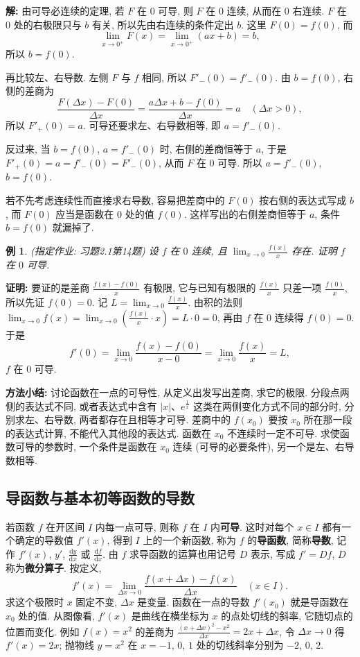 \documentclass[UTF8,openany]{ctexbook}
\theoremstyle{chinesetextbook}
\newtheorem{example}{例}[section]
\newenvironment{cnproof}{\par\indent\textbf{证明:} \ignorespaces}{\par}
\newenvironment{cnsolution}{\par\indent\textbf{解:} \ignorespaces}{\par}
\newcommand{\dd}{\mathrm d}
\begin{document}
\begin{cnsolution}
由可导必连续的定理, 若 $F$ 在 $0$ 可导, 则 $F$ 在 $0$ 连续, 从而在 $0$ 右连续. $F$ 在 $0$ 处的右极限只与 $b$ 有关, 所以先由右连续的条件定出 $b$. 这里 $F(0)=f(0)$, 而
\[
\lim_{x\to0^+}F(x)=\lim_{x\to0^+}(ax+b)=b,
\]
所以 $b=f(0)$.

再比较左、右导数. 左侧 $F$ 与 $f$ 相同, 所以 $F'_-(0)=f'_-(0)$. 由 $b=f(0)$, 右侧的差商为
\[
\frac{F(\Delta x)-F(0)}{\Delta x}=\frac{a\Delta x+b-f(0)}{\Delta x}=a\quad(\Delta x>0),
\]
所以 $F'_+(0)=a$. 可导还要求左、右导数相等, 即 $a=f'_-(0)$.

反过来, 当 $b=f(0)$, $a=f'_-(0)$ 时, 右侧的差商恒等于 $a$, 于是 $F'_+(0)=a=f'_-(0)=F'_-(0)$, 从而 $F$ 在 $0$ 可导. 所以 $a=f'_-(0)$, $b=f(0)$.
\end{cnsolution}
若不先考虑连续性而直接求右导数, 容易把差商中的 $F(0)$ 按右侧的表达式写成 $b$, 而 $F(0)$ 应当是函数在 $0$ 处的值 $f(0)$. 这样写出的右侧差商恒等于 $a$, 条件 $b=f(0)$ 就漏掉了.
\begin{example}\label{ex:c2-h1-14}
\textnormal{(指定作业: 习题2.1第14题)} 设 $f$ 在 $0$ 连续, 且 $\displaystyle\lim_{x\to0}\frac{f(x)}x$ 存在. 证明 $f$ 在 $0$ 可导.
\end{example}
\begin{cnproof}
要证的是差商 $\displaystyle\frac{f(x)-f(0)}x$ 有极限, 它与已知有极限的 $\displaystyle\frac{f(x)}x$ 只差一项 $\displaystyle\frac{f(0)}x$, 所以先证 $f(0)=0$. 记 $\displaystyle L=\lim_{x\to0}\frac{f(x)}x$. 由积的法则 $\displaystyle\lim_{x\to0}f(x)=\lim_{x\to0}\left(\frac{f(x)}x\cdot x\right)=L\cdot0=0$, 再由 $f$ 在 $0$ 连续得 $f(0)=0$. 于是
\[
f'(0)=\lim_{x\to0}\frac{f(x)-f(0)}{x-0}=\lim_{x\to0}\frac{f(x)}x=L,
\]
$f$ 在 $0$ 可导.
\end{cnproof}
\par\indent\textbf{方法小结:} 讨论函数在一点的可导性, 从定义出发写出差商, 求它的极限. 分段点两侧的表达式不同, 或者表达式中含有 $|x|$、$e^{\frac1x}$ 这类在两侧变化方式不同的部分时, 分别求左、右导数, 两者都存在且相等才可导. 差商中的 $f(x_0)$ 要按 $x_0$ 所在那一段的表达式计算, 不能代入其他段的表达式. 函数在 $x_0$ 不连续时一定不可导. 求使函数可导的参数时, 一个条件是函数在 $x_0$ 连续 (可导的必要条件), 另一个是左、右导数相等.
\subsection{导函数与基本初等函数的导数}
若函数 $f$ 在开区间 $I$ 内每一点可导, 则称 $f$ 在 $I$ 内\textbf{可导}. 这时对每个 $x\in I$ 都有一个确定的导数值 $f'(x)$, 得到 $I$ 上的一个新函数, 称为 $f$ 的\textbf{导函数}, 简称\textbf{导数}, 记作 $f'(x)$, $y'$, $\displaystyle\frac{\dd y}{\dd x}$ 或 $\displaystyle\frac{\dd f}{\dd x}$. 由 $f$ 求导函数的运算也用记号 $D$ 表示, 写成 $f'=Df$, $D$ 称为\textbf{微分算子}. 按定义,
\[
f'(x)=\lim_{\Delta x\to0}\frac{f(x+\Delta x)-f(x)}{\Delta x}\quad(x\in I).
\]
求这个极限时 $x$ 固定不变, $\Delta x$ 是变量. 函数在一点的导数 $f'(x_0)$ 就是导函数在 $x_0$ 处的值. 从图像看, $f'(x)$ 是曲线在横坐标为 $x$ 的点处切线的斜率, 它随切点的位置而变化. 例如 $f(x)=x^2$ 的差商为 $\displaystyle\frac{(x+\Delta x)^2-x^2}{\Delta x}=2x+\Delta x$, 令 $\Delta x\to0$ 得 $f'(x)=2x$; 抛物线 $y=x^2$ 在 $x=-1$, $0$, $1$ 处的切线斜率分别为 $-2$, $0$, $2$.
\end{document}
